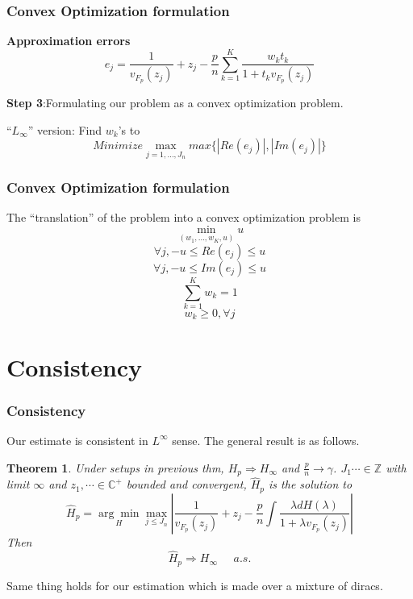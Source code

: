 \documentclass[aspectratio=169, 10pt, utf8, mathserif]{beamer}
\newtheorem{thm}{Theorem}
\begin{document}
\begin{frame}
	\frametitle{Convex Optimization formulation}
	\textbf{Approximation errors}
	\[e_j=\frac{1}{v_{F_p}(z_j)}+z_j-\frac{p}{n}\sum_{k=1}^{K}\frac{w_{k}t_k}{1+t_{k}v_{F_p}(z_j)}\]
	
\textbf{Step 3}:Formulating our problem as a convex optimization problem.

 “$L_\infty$” version: Find $w_k$’s to\[Minimize\max_{j=1,\dots,J_n}max\{|Re(e_j)|,|Im(e_j)|\}\]
\end{frame}
\begin{frame}
	\frametitle{Convex Optimization formulation}
 The “translation” of the problem into a convex optimization problem is\[\min_{(w_1,\dots,w_K,u)}u\]\[\forall j,-u\leq Re(e_j)\leq u\]\[\forall j,-u\leq Im(e_j)\leq u\]\[\sum_{k=1}^{K}w_k=1\]\[w_k\geq0,\forall j\]

\end{frame}


\section{Consistency}

\begin{frame}
	\frametitle{Consistency}
	Our estimate is consistent in $L^{\infty}$ sense. The general result is as follows.\\
		\begin{thm} 
	 Under setups in previous thm, $H_p\Rightarrow H_{\infty}$ and $\frac{p}{n}\to \gamma$. $J_1 \cdots \in \mathbb{Z}$ with limit $\infty$ and $z_1,\cdots\in \mathbb{C}^+$ bounded and convergent, $\hat{H}_p$ is the solution to 
	 $$
	 \widehat{H}_{p}=\underset{H}{\arg \min } \max _{j \leq J_{n}}\left|\frac{1}{v_{F_{p}}\left(z_{j}\right)}+z_{j}-\frac{p}{n} \int \frac{\lambda d H(\lambda)}{1+\lambda v_{F_{p}}\left(z_{j}\right)}\right|
	 $$
	 Then 
	 $$
	 \hat{H}_p\Rightarrow H_{\infty} \;\;\;\;\; a.s.
	 $$
	 \end{thm}
	Same thing holds for our estimation which is made over a mixture of diracs. 
\end{frame}
\end{document}
